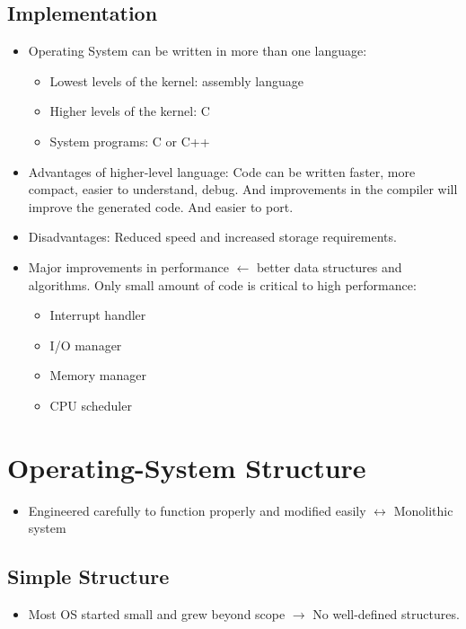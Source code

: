 \documentclass[10pt]{report}
\begin{document}
        \subsection{Implementation}
          \begin{itemize}
            \item Operating System can be written in more than one language:
            \begin{itemize}
              \item Lowest levels of the kernel: assembly language
              \item Higher levels of the kernel: C
              \item System programs: C or C++
            \end{itemize}
            \item Advantages of higher-level language: Code can be written faster, more compact, easier to understand, debug. And improvements in the compiler will improve the generated code. And easier to port.
            \item Disadvantages: Reduced speed and increased storage requirements.
            \item Major improvements in performance $\leftarrow$ better data structures and algorithms. Only small amount of code is critical to high performance:
            \begin{itemize}
              \item Interrupt handler
              \item I/O manager
              \item Memory manager
              \item CPU scheduler
            \end{itemize}
          \end{itemize}

      \section{Operating-System Structure}
        \begin{itemize}
          \item Engineered carefully to function properly and modified easily $\leftrightarrow$ Monolithic system
        \end{itemize}
        \subsection{Simple Structure}
          \begin{itemize}
            \item Most OS started small and grew beyond scope $\rightarrow$ No well-defined structures.
          \end{itemize}
\end{document}
